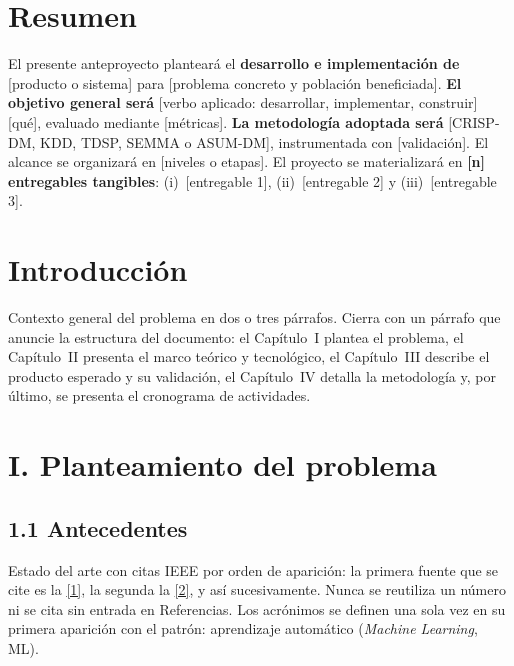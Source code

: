 \documentclass[12pt,letterpaper]{report}
\newcommand{\cita}[1]{\hyperref[bib:#1]{[#1]}}
\begin{document}
\chapter*{Resumen}

El presente anteproyecto planteará el \textbf{desarrollo e implementación de} [producto o sistema] para [problema concreto y población beneficiada]. \textbf{El objetivo general será} [verbo aplicado: desarrollar, implementar, construir] [qué], evaluado mediante [métricas]. \textbf{La metodología adoptada será} [CRISP-DM, KDD, TDSP, SEMMA o ASUM-DM], instrumentada con [validación]. El alcance se organizará en [niveles o etapas]. El proyecto se materializará en \textbf{[n] entregables tangibles}: (i)~[entregable 1], (ii)~[entregable 2] y (iii)~[entregable 3].

\clearpage


\chapter{Introducción}

Contexto general del problema en dos o tres párrafos. Cierra con un párrafo que anuncie la estructura del documento: el Capítulo~I plantea el problema, el Capítulo~II presenta el marco teórico y tecnológico, el Capítulo~III describe el producto esperado y su validación, el Capítulo~IV detalla la metodología y, por último, se presenta el cronograma de actividades.

\chapter{I. Planteamiento del problema}

\section{1.1 Antecedentes}

Estado del arte con citas IEEE por orden de aparición: la primera fuente que se cite es la \cita{1}, la segunda la \cita{2}, y así sucesivamente. Nunca se reutiliza un número ni se cita sin entrada en Referencias. Los acrónimos se definen una sola vez en su primera aparición con el patrón: aprendizaje automático (\textit{Machine Learning}, ML).
\end{document}
